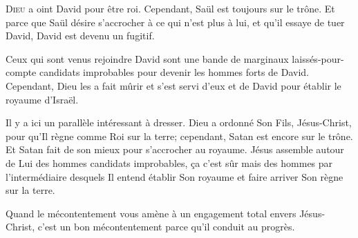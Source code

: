 \dvrule






\lettrine{D}{ieu} a oint David pour être roi.
 Cependant, Saül est toujours sur le trône.
 Et parce que Saül désire s'accrocher à ce qui n'est plus à lui,
 et qu'il essaye de tuer David, David est devenu un fugitif.

Ceux qui sont venus rejoindre David sont une bande de marginaux
 laissés-pour-compte \ocadr candidats improbables pour devenir
 les hommes forts de David.
 Cependant, Dieu les a fait mûrir et s'est servi d'eux
 et de David pour établir le royaume d'Israël.

Il y a ici un parallèle intéressant à dresser.
 Dieu a ordonné Son Fils, Jésus-Christ, pour qu'Il règne comme Roi sur la terre;
 cependant, Satan est encore sur le trône.
 Et Satan fait de son mieux pour s'accrocher au royaume.
 Jésus assemble autour de Lui des hommes
 \ocadr candidats improbables, \c{c}a c'est sûr \fcadr
 mais des hommes par l'intermédiaire desquels Il entend établir Son royaume
 et faire arriver Son règne sur la terre.


Quand le mécontentement vous amène à un engagement total envers Jésus-Christ,
 c'est un bon mécontentement parce qu'il conduit au progrès. 

\dvrule





